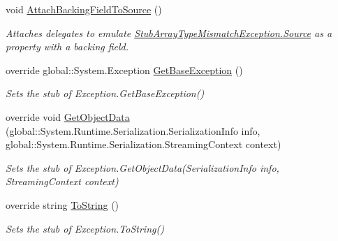 \begin{DoxyCompactItemize}
void \hyperlink{class_system_1_1_fakes_1_1_stub_array_type_mismatch_exception_ab9cd06d2ac02b29f95a136ddf81d138e}{Attach\-Backing\-Field\-To\-Source} ()
\begin{DoxyCompactList}\small\item\em Attaches delegates to emulate \hyperlink{class_system_1_1_fakes_1_1_stub_array_type_mismatch_exception_a51c0f6250ede397e44797eb01718280a}{Stub\-Array\-Type\-Mismatch\-Exception.\-Source} as a property with a backing field.\end{DoxyCompactList}\item 
override global\-::\-System.\-Exception \hyperlink{class_system_1_1_fakes_1_1_stub_array_type_mismatch_exception_a1b8bd7f90e5a3e81c411fdd81a6dc1cd}{Get\-Base\-Exception} ()
\begin{DoxyCompactList}\small\item\em Sets the stub of Exception.\-Get\-Base\-Exception()\end{DoxyCompactList}\item 
override void \hyperlink{class_system_1_1_fakes_1_1_stub_array_type_mismatch_exception_aec7ea50bb8ebcab43a1cb25ff7aae184}{Get\-Object\-Data} (global\-::\-System.\-Runtime.\-Serialization.\-Serialization\-Info info, global\-::\-System.\-Runtime.\-Serialization.\-Streaming\-Context context)
\begin{DoxyCompactList}\small\item\em Sets the stub of Exception.\-Get\-Object\-Data(\-Serialization\-Info info, Streaming\-Context context)\end{DoxyCompactList}\item 
override string \hyperlink{class_system_1_1_fakes_1_1_stub_array_type_mismatch_exception_a694fad9cac0b000378f2a6ef3e046eb2}{To\-String} ()
\begin{DoxyCompactList}\small\item\em Sets the stub of Exception.\-To\-String()\end{DoxyCompactList}\end{DoxyCompactItemize}
